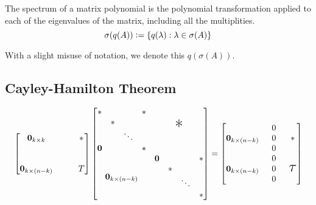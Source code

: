 \begin{remark*}
The spectrum of a matrix polynomial is the polynomial transformation applied to each of the eigenvalues of the matrix, including all the multiplities.
$$
\sigma(q(A)) \vcentcolon= \{q(\lambda) : \lambda \in \sigma(A) \}
$$
\end{remark*}
\noindent With a slight misuse of notation, we denote this $q(\sigma(A))$.


\subsection{Cayley-Hamilton Theorem}
\begin{lemma}
\label{lem:upper-triang-product-with-zero-entry}
$$
\begin{bmatrix}
\mathbf{0}_{k\times k} & & & * \\
  & & & \\
  & & & \\
\mathbf{0}_{k\times (n-k)} & & & T
\end{bmatrix}
\begin{bmatrix}
\begin{matrix}
* & & & * \\
 & * & & \\
 & & \ddots & \\
\mathbf{0} & & & *
\end{matrix} & \textup{\huge*} \\
\mathbf{0}_{k\times (n-k)} & \begin{matrix} \mathbf{0} & & & * \\ & * & & \\ & & \ddots & \\ & & & * \end{matrix}
\end{bmatrix}
= \begin{bmatrix}
\mathbf{0}_{k\times (n-k)} & \begin{array}{c} 0 \\ 0 \\ 0
\end{array} & * \\
\mathbf{0}_{k\times (n-k)} & \begin{array}{c} 0 \\ 0 \\ 0
\end{array} & \mathlarger{\mathlarger{\mathlarger{\mathlarger{\tau}}}}
\end{bmatrix}
$$
\end{lemma}

